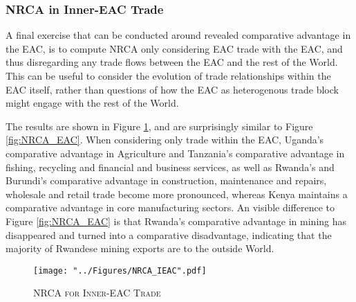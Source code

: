 \documentclass[a4paper]{article}
\begin{document}
\subsubsection{NRCA in Inner-EAC Trade}

A final exercise that can be conducted around revealed comparative advantage in the EAC, is to compute NRCA only considering EAC trade with the EAC, and thus disregarding any trade flows between the EAC and the rest of the World. This can be useful to consider the evolution of trade relationships within the EAC itself, rather than questions of how the EAC as heterogenous trade block might engage with the rest of the World.  \newline

The results are shown in Figure \ref{fig:NRCA_IEAC}, and are surprisingly similar to Figure \ref{fig:NRCA_EAC}. When considering only trade within the EAC, Uganda's comparative advantage in Agriculture and Tanzania's comparative advantage in fishing, recycling and financial and business services, as well as Rwanda's and Burundi's comparative advantage in construction, maintenance and repairs, wholesale and retail trade become more pronounced, whereas Kenya maintains a comparative advantage in core manufacturing sectors.  An visible difference to Figure \ref{fig:NRCA_EAC} is that Rwanda's comparative advantage in mining has disappeared and turned into a comparative disadvantage, indicating that the majority of Rwandese mining exports are to the outside World. 

\begin{figure}[h!]
\centering
\caption{\label{fig:NRCA_IEAC}\textsc{NRCA for Inner-EAC Trade}}
\texttt{[image: "../Figures/NRCA\_IEAC".pdf]} %
\end{figure}
\FloatBarrier

\end{document}
